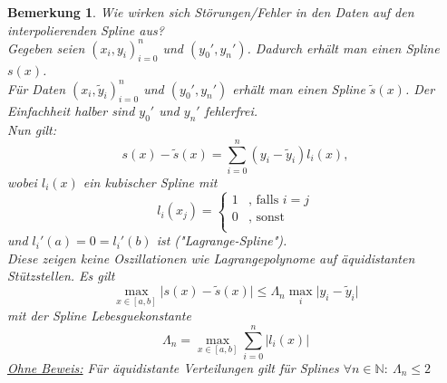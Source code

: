 \documentclass[12pt]{article}
\theoremstyle{break}
\newtheorem*{comment*}{Bemerkung}
\begin{document}
\begin{comment*}
Wie wirken sich Störungen/Fehler in den Daten auf den interpolierenden Spline aus? \\
Gegeben seien $(x_i, y_i)_{i=0}^n$ und $(y_0', y_n')$. Dadurch erhält man einen Spline $s(x)$. \\
Für Daten $(x_i, \tilde{y}_i)_{i=0}^n$ und $(y_0', y_n')$ erhält man einen Spline $\tilde{s}(x)$. Der Einfachheit halber sind $y_0'$ und $y_n'$ fehlerfrei. \\
Nun gilt:
$$s(x) - \tilde{s}(x) = \sum_{i=0}^n (y_i - \tilde{y}_i) l_i(x),$$
wobei $l_i(x)$ ein kubischer Spline mit 
$$l_i(x_j) =
\begin{cases}
  1 & \text{, falls } i=j \\
  0 &\text{, sonst} \\
\end{cases}  $$
und $l_i'(a) = 0 = l_i'(b)$ ist ("Lagrange-Spline"). \\
Diese zeigen keine Oszillationen wie Lagrangepolynome auf äquidistanten Stützstellen. Es gilt 
$$\max_{x \in [a,b]} \vert s(x) - \tilde{s}(x) \vert \leq \Lambda_n \max_i \vert y_i - \tilde{y}_i \vert $$
mit der Spline Lebesguekonstante 
$$\Lambda_n = \max_{x \in [a,b]} \sum_{i=0}^n \vert l_i(x) \vert $$
\underline{Ohne Beweis:} Für äquidistante Verteilungen gilt für Splines $\forall n \in \mathbb{N}: \medspace \Lambda_n \leq 2$
\end{comment*}
\end{document}
